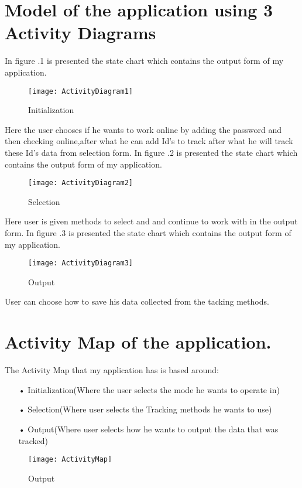 
\setlength{\parindent}{2ex}
\section{Model of the application using 3 Activity Diagrams}
In figure \thesection.1 is presented the state chart which contains the output form of my application.
\par
\begin{figure}[h!]
	\centering
	\texttt{[image: ActivityDiagram1]}
	\caption{Initialization} 
\end{figure}
\par
Here the user chooses if he wants to work online by adding the password and then checking online,after what he can add Id's to track after what he will track these Id's data from selection form.
\newpage
In figure \thesection.2 is presented the state chart which contains the output form of my application.
\begin{figure}[h!]
	\centering
	\texttt{[image: ActivityDiagram2]}
	\caption{Selection} 
\end{figure}
\par
Here user is given methods to select and and continue to work with in the output form.
\newpage
In figure \thesection.3 is presented the state chart which contains the output form of my application.
\begin{figure}[h!]
	\centering
	\texttt{[image: ActivityDiagram3]}
	\caption{Output} 
\end{figure}
\par 
User can choose how to save his data collected from the tacking methods.
\newpage
\section{Activity Map of the application.}
The Activity Map that my application has is based around:
\begin{itemize}
\item[•] Initialization(Where the user selects the mode he wants to operate in)
\item[•] Selection(Where user selects the Tracking methods he wants to use)
\item[•] Output(Where user selects how he wants to output the data that was tracked)
\end{itemize}
\begin{figure}[h!]
	\centering
	\texttt{[image: ActivityMap]}
	\caption{Output} 
\end{figure}
\clearpage
